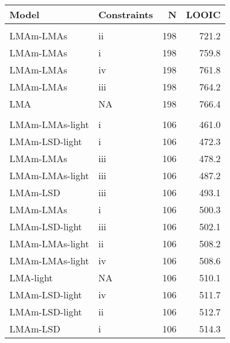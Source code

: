 \documentclass[
  12pt,
  a4paper,
,tablecaptionabove
]{scrartcl}
\begin{document}
\begin{table}
\centering
\begin{tabular}{llrr}
\toprule
Model & Constraints & N & LOOIC\\
\midrule
\addlinespace[0.3em]
\multicolumn{4}{l}{\textbf{GLOPNET}}\\
\hspace{1em}LMAm-LMAs & ii & 198 & 721.2\\
\hspace{1em}LMAm-LMAs & i & 198 & 759.8\\
\hspace{1em}LMAm-LMAs & iv & 198 & 761.8\\
\hspace{1em}LMAm-LMAs & iii & 198 & 764.2\\
\hspace{1em}LMA & NA & 198 & 766.4\\
\addlinespace[0.3em]
\multicolumn{4}{l}{\textbf{Panama}}\\
\hspace{1em}LMAm-LMAs-light & i & 106 & 461.0\\
\hspace{1em}LMAm-LSD-light & i & 106 & 472.3\\
\hspace{1em}LMAm-LMAs & iii & 106 & 478.2\\
\hspace{1em}LMAm-LMAs-light & iii & 106 & 487.2\\
\hspace{1em}LMAm-LSD & iii & 106 & 493.1\\
\hspace{1em}LMAm-LMAs & i & 106 & 500.3\\
\hspace{1em}LMAm-LSD-light & iii & 106 & 502.1\\
\hspace{1em}LMAm-LMAs-light & ii & 106 & 508.2\\
\hspace{1em}LMAm-LMAs-light & iv & 106 & 508.6\\
\hspace{1em}LMA-light & NA & 106 & 510.1\\
\hspace{1em}LMAm-LSD-light & iv & 106 & 511.7\\
\hspace{1em}LMAm-LSD-light & ii & 106 & 512.7\\
\hspace{1em}LMAm-LSD & i & 106 & 514.3\\

\end{tabular}
\end{table}
\end{document}
